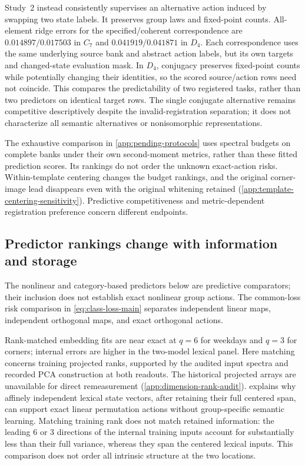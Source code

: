 Study~2 instead consistently supervises an alternative action induced by swapping two state labels. It preserves group laws and fixed-point counts. All-element ridge errors for the specified/coherent correspondence are $0.014897/0.017503$ in $C_7$ and $0.041919/0.041871$ in $D_4$. Each correspondence uses the same underlying source bank and abstract action labels, but its own targets and changed-state evaluation mask. In $D_4$, conjugacy preserves fixed-point counts while potentially changing their identities, so the scored source/action rows need not coincide. This compares the predictability of two registered tasks, rather than two predictors on identical target rows. The single conjugate alternative remains competitive descriptively despite the invalid-registration separation; it does not characterize all semantic alternatives or nonisomorphic representations.

The exhaustive comparison in \cref{app:pending-protocols} uses spectral budgets on complete banks under their own second-moment metrics, rather than these fitted prediction scores. Its rankings do not order the unknown exact-action risks. Within-template centering changes the budget rankings, and the original corner-image lead disappears even with the original whitening retained (\cref{app:template-centering-sensitivity}). Predictive competitiveness and metric-dependent registration preference concern different endpoints.

\subsection{Predictor rankings change with information and storage}
The nonlinear and category-based predictors below are predictive comparators; their inclusion does not establish exact nonlinear group actions. The common-loss risk comparison in \cref{eq:class-loss-main} separates independent linear maps, independent orthogonal maps, and exact orthogonal actions.

Rank-matched embedding fits are near exact at $q=6$ for weekdays and $q=3$ for corners; internal errors are higher in the two-model lexical panel. Here matching concerns training projected ranks, supported by the audited input spectra and recorded PCA construction at both readouts. The historical projected arrays are unavailable for direct remeasurement (\cref{app:dimension-rank-audit}).  explains why affinely independent lexical state vectors, after retaining their full centered span, can support exact linear permutation actions without group-specific semantic learning. Matching training rank does not match retained information: the leading 6 or 3 directions of the internal training inputs account for substantially less than their full variance, whereas they span the centered lexical inputs. This comparison does not order all intrinsic structure at the two locations.

